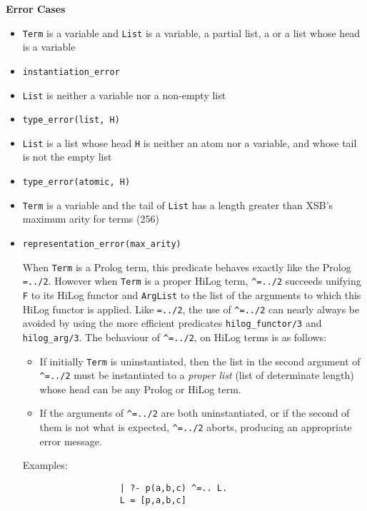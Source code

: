 \begin{description}
{\bf Error Cases}
\begin{itemize}
\item {\tt Term} is a variable and {\tt List} is a variable, a partial list,
a  or a list whose head is a variable
\bi
\item {\tt instantiation\_error}
\ei
\item {\tt List} is neither a variable nor a non-empty list
\bi
\item {\tt type\_error(list, H)}
\ei
\item {\tt List} is a list whose head {\tt H} is neither an atom nor a
  variable, and whose tail is not the empty list 
\bi
\item {\tt type\_error(atomic, H)}
\ei
\item {\tt Term} is a variable and the tail of {\tt List} has a length
  greater than XSB's maximum arity for terms (256) 
\bi
\item {\tt representation\_error(max\_arity)}
\ei
\ei


    When {\tt Term} is a Prolog term, this predicate behaves exactly like
    the Prolog {\tt =../2}. However when {\tt Term} is a proper HiLog term, 
    {\tt \verb|^|=../2} 
    succeeds unifying {\tt F} to its HiLog functor and {\tt ArgList} to the 
    list of the arguments to which this HiLog functor is applied. Like 
    {\tt =../2}, the use of {\tt \verb|^|=../2} can nearly always be avoided
    by using the more efficient predicates {\tt hilog\_functor/3} and 
    {\tt hilog\_arg/3}. The behaviour of {\tt \verb|^|=../2}, on HiLog terms 
    is as follows:
    \begin{itemize}
    \item If initially {\tt Term} is uninstantiated, then the list in the 
          second argument of {\tt \verb|^|=../2} must be instantiated to 
          a {\em proper list} (list of determinate length) whose head can 
          be any Prolog or HiLog term.
    \item If the arguments of {\tt \verb|^|=../2} are both uninstantiated, 
          or if the second of them is not what is expected, 
          {\tt \verb|^|=../2} aborts, producing an appropriate error message.
    \end{itemize}
    Examples:
    {\footnotesize
     \begin{verbatim}
                   | ?- p(a,b,c) ^=.. L.
                   L = [p,a,b,c]


\end{verbatim}}
\end{itemize}
\end{description}
